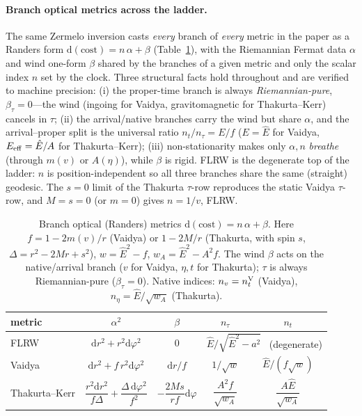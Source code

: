 \documentclass[
    aps, prd, twocolumn, superscriptaddress,
    showpacs, nofootinbib, floatfix
]{revtex4-2}
\newcommand{\Ehat}{\hat E}
\newcommand{\dd}{\mathrm{d}}
\begin{document}
\paragraph{Branch optical metrics across the ladder.} The same Zermelo inversion
casts \emph{every} branch of \emph{every} metric in the paper as a Randers form
$\dd(\text{cost})=n\,\alpha+\beta$ (Table~\ref{tab:optical}), with the Riemannian
Fermat data $\alpha$ and wind one-form $\beta$ shared by the branches of a given
metric and only the scalar index $n$ set by the clock. Three structural facts
hold throughout and are verified to machine precision: (i) the proper-time branch
is always \emph{Riemannian-pure}, $\beta_\tau=0$---the wind (ingoing for Vaidya,
gravitomagnetic for Thakurta--Kerr) cancels in $\tau$; (ii) the arrival/native
branches carry the wind but share $\alpha$, and the arrival--proper split is the
universal ratio $n_t/n_\tau=E/f$ ($E=\Ehat$ for Vaidya, $E_{\rm eff}=\Ehat/A$ for
Thakurta--Kerr); (iii) non-stationarity makes only $\alpha,n$ \emph{breathe}
(through $m(v)$ or $A(\eta)$), while $\beta$ is rigid. FLRW is the degenerate top
of the ladder: $n$ is position-independent so all three branches share the same
(straight) geodesic. The $s=0$ limit of the Thakurta $\tau$-row reproduces the
static Vaidya $\tau$-row, and $M=s=0$ (or $m=0$) gives $n=1/v$, FLRW.

\begin{table}[t]
    \centering
    \caption{Branch optical (Randers) metrics $\dd(\text{cost})=n\,\alpha+\beta$.
    Here $f=1-2m(v)/r$ (Vaidya) or $1-2M/r$ (Thakurta, with spin $s$,
    $\Delta=r^2-2Mr+s^2$), $w=\Ehat^2-f$, $w_A=\Ehat^2-A^2f$. The wind $\beta$
    acts on the native/arrival branch ($v$ for Vaidya, $\eta,t$ for Thakurta);
    $\tau$ is always Riemannian-pure ($\beta_\tau=0$). Native indices:
    $n_v=n_t^{\rm V}$ (Vaidya), $n_\eta=\Ehat/\sqrt{w_A}$ (Thakurta).}
    \label{tab:optical}
    \begin{ruledtabular}
    \begin{tabular}{lcccc}
    metric & $\alpha^2$ & $\beta$ & $n_\tau$ & $n_t$ \\
    \hline
    FLRW & $\dd r^2+r^2\dd\varphi^2$ & $0$
      & \multicolumn{2}{c}{$\Ehat/\sqrt{\Ehat^2-a^2}$ \ (degenerate)} \\[2pt]
    Vaidya & $\dd r^2+f\,r^2\dd\varphi^2$ & $\dd r/f$
      & $1/\sqrt{w}$ & $\Ehat/(f\sqrt{w})$ \\[2pt]
    Thakurta--Kerr
      & $\dfrac{r^2\dd r^2}{f\Delta}+\dfrac{\Delta\,\dd\varphi^2}{f^2}$
      & $-\dfrac{2Ms}{rf}\dd\varphi$
      & $\dfrac{A^2 f}{\sqrt{w_A}}$ & $\dfrac{A\Ehat}{\sqrt{w_A}}$ \\[3pt]
    \end{tabular}
    \end{ruledtabular}
\end{table}
\end{document}
